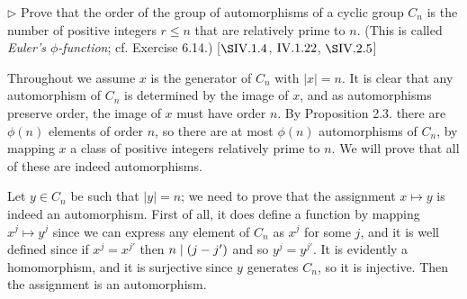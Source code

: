 \begin{exercise}
	$\triangleright$ Prove that the order of the group of automorphisms of a cyclic group $C_n$ is the number of positive integers $r\leq n$ that are relatively prime to $n$. (This is called \emph{Euler's $\phi$-function}; cf. Exercise 6.14.) [$\S\RNo{4}.1.4$, $\RNo{4}.1.22$, $\S\RNo{4}.2.5$]
\end{exercise}
\begin{solution}
	Throughout we assume $x$ is the generator of $C_n$ with $|x| = n$. It is clear that any automorphism of $C_n$ is determined by the image of $x$, and as automorphisms preserve order, the image of $x$ must have order $n$. By Proposition 2.3. there are $\phi(n)$ elements of order $n$, so there are at most $\phi(n)$ automorphisms of $C_n$, by mapping $x$ a class of positive integers relatively prime to $n$. We will prove that all of these are indeed automorphisms.
	
	Let $y\in C_n$ be such that $|y| = n$; we need to prove that the assignment $x\mapsto y$ is indeed an automorphism. First of all, it does define a function by mapping $x^j \mapsto y^j$ since we can express any element of $C_n$ as $x^j$ for some $j$, and it is well defined since if $x^j = x^{j'}$ then $n\mid (j-j')$ and so $y^j = y^{j'}$. It is evidently a homomorphism, and it is surjective since $y$ generates $C_n$, so it is injective. Then the assignment is an automorphism.	
\end{solution}

